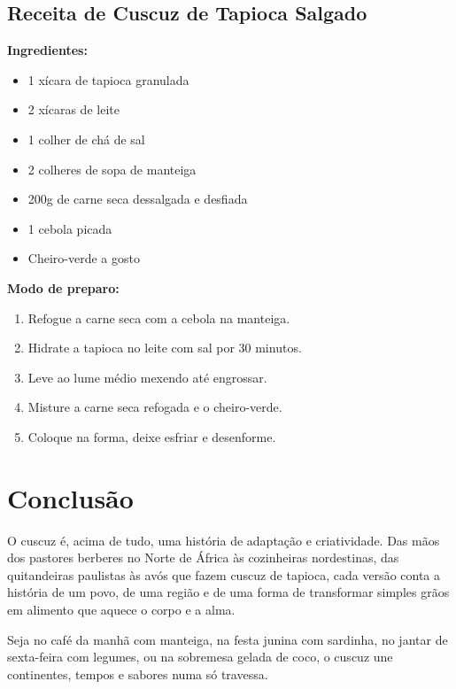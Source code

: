 \documentclass[12pt,a4paper,openright]{book}
\begin{document}
\section{Receita de Cuscuz de Tapioca Salgado}

\textbf{Ingredientes:}
\begin{itemize}
    \item 1 xícara de tapioca granulada
    \item 2 xícaras de leite
    \item 1 colher de chá de sal
    \item 2 colheres de sopa de manteiga
    \item 200g de carne seca dessalgada e desfiada
    \item 1 cebola picada
    \item Cheiro-verde a gosto
\end{itemize}

\textbf{Modo de preparo:}
\begin{enumerate}
    \item Refogue a carne seca com a cebola na manteiga.
    \item Hidrate a tapioca no leite com sal por 30 minutos.
    \item Leve ao lume médio mexendo até engrossar.
    \item Misture a carne seca refogada e o cheiro-verde.
    \item Coloque na forma, deixe esfriar e desenforme.
\end{enumerate}

\chapter*{Conclusão}

O cuscuz é, acima de tudo, uma história de adaptação e criatividade. Das mãos dos pastores berberes no Norte de África às cozinheiras nordestinas, das quitandeiras paulistas às avós que fazem cuscuz de tapioca, cada versão conta a história de um povo, de uma região e de uma forma de transformar simples grãos em alimento que aquece o corpo e a alma.

Seja no café da manhã com manteiga, na festa junina com sardinha, no jantar de sexta-feira com legumes, ou na sobremesa gelada de coco, o cuscuz une continentes, tempos e sabores numa só travessa.
\end{document}
